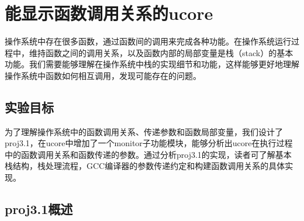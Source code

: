 \section{能显示函数调用关系的ucore}\label{ux80fdux663eux793aux51fdux6570ux8c03ux7528ux5173ux7cfbux7684ucore}

操作系统中存在很多函数，通过函数间的调用来完成各种功能。在操作系统运行过程中，维持函数之间的调用关系，以及函数内部的局部变量是栈（stack）的基本功能。我们需要能够理解在操作系统中栈的实现细节和功能，这样能够更好地理解操作系统中函数如何相互调用，发现可能存在的问题。

\subsection{实验目标}\label{ux5b9eux9a8cux76eeux6807}

为了理解操作系统中的函数调用关系、传递参数和函数局部变量，我们设计了proj3.1，在ucore中增加了一个monitor子功能模块，能够分析出ucore在执行过程中的函数调用关系和函数传递的参数。通过分析proj3.1的实现，读者可了解基本栈结构，栈处理流程，GCC编译器的参数传递约定和构建函数调用关系的具体实现。

\subsection{proj3.1概述}\label{proj3.1ux6982ux8ff0}

